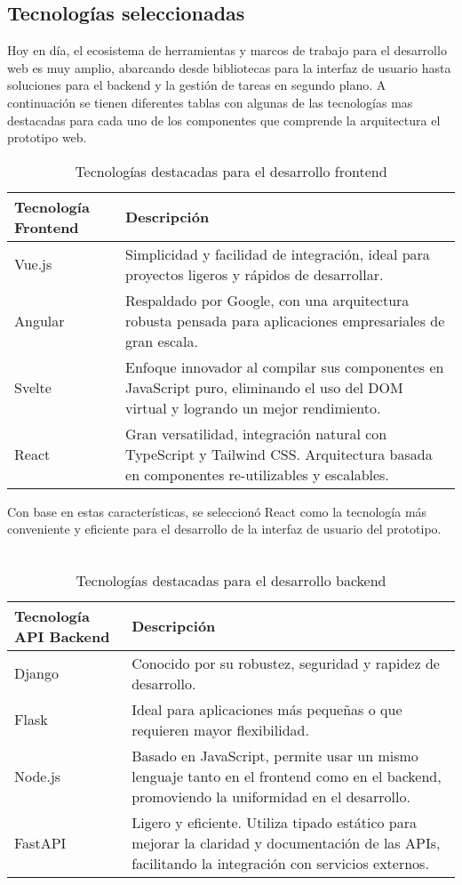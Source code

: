 \subsection{Tecnologías seleccionadas}
\noindent Hoy en d\'ia, el ecosistema de herramientas y marcos de trabajo para el desarrollo web es muy amplio, abarcando desde bibliotecas para la interfaz de usuario hasta soluciones para el backend y la gesti\'on de tareas en segundo plano. A continuación se tienen diferentes tablas con algunas de las tecnologías mas destacadas para cada uno de los componentes que comprende la arquitectura el prototipo web.

\begin{table}[H]
\centering
\begin{tabular}{|l|p{10cm}|}
\hline
\textbf{Tecnología Frontend} & \textbf{Descripción} \\
\hline
Vue.js & Simplicidad y facilidad de integración, ideal para proyectos ligeros y rápidos de desarrollar. \\
\hline
Angular & Respaldado por Google, con una arquitectura robusta pensada para aplicaciones empresariales de gran escala. \\
\hline
Svelte & Enfoque innovador al compilar sus componentes en JavaScript puro, eliminando el uso del DOM virtual y logrando un mejor rendimiento. \\
\hline
React & Gran versatilidad, integración natural con TypeScript y Tailwind CSS. Arquitectura basada en componentes re-utilizables y escalables. \\
\hline
\end{tabular}
\caption{Tecnologías destacadas para el desarrollo frontend}
\end{table}

\noindent Con base en estas características, se seleccionó React como la tecnología más conveniente y eficiente para el desarrollo de la interfaz de usuario del prototipo.
\\
\\

\begin{table}[H]
\centering
\begin{tabular}{|l|p{10cm}|}
\hline
\textbf{Tecnología API Backend} & \textbf{Descripción} \\
\hline
Django & Conocido por su robustez, seguridad y rapidez de desarrollo. \\
\hline
Flask & Ideal para aplicaciones más pequeñas o que requieren mayor flexibilidad. \\
\hline
Node.js & Basado en JavaScript, permite usar un mismo lenguaje tanto en el frontend como en el backend, promoviendo la uniformidad en el desarrollo. \\
\hline
FastAPI & Ligero y eficiente. Utiliza tipado estático para mejorar la claridad y documentación de las APIs, facilitando la integración con servicios externos.\\
\hline
\end{tabular}
\caption{Tecnologías destacadas para el desarrollo backend}
\end{table}

